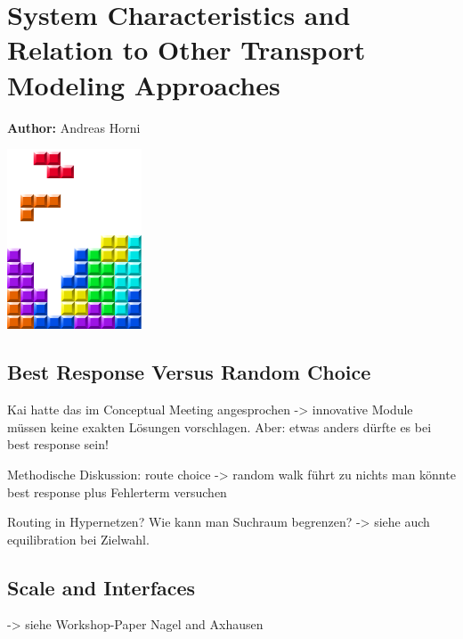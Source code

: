 \chapter{System Characteristics and Relation to Other Transport Modeling Approaches}
\label{ch:systemspec}

\hfill \textbf{Author:} Andreas Horni

\begin{center} \includegraphics[width=0.3\textwidth, angle=0]{figures/MATSimBook.png} \end{center}

\section{Best Response Versus Random Choice}
\label{sec:bestResponseOrRandom}
Kai hatte das im Conceptual Meeting angesprochen -> innovative Module müssen keine exakten Lösungen vorschlagen. 
Aber: etwas anders dürfte es bei best response sein!


Methodische Diskussion:
route choice -> random walk führt zu nichts
man könnte best response plus Fehlerterm versuchen

Routing in Hypernetzen?
Wie kann man Suchraum begrenzen? -> siehe auch equilibration bei Zielwahl.




\section{Scale and Interfaces}
-> siehe Workshop-Paper Nagel and Axhausen

